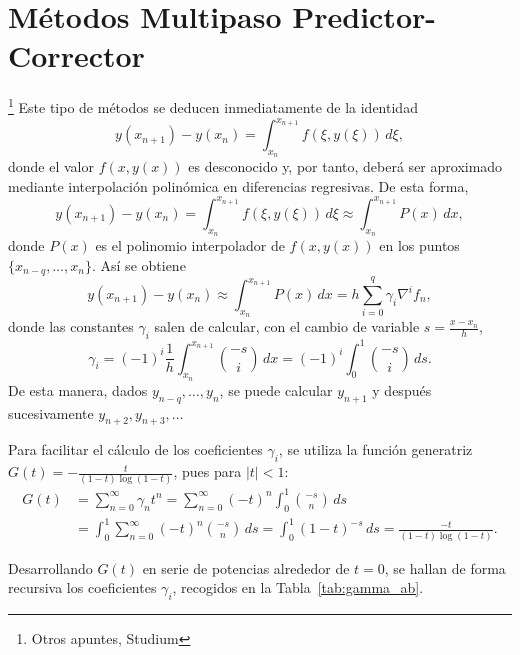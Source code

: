 \section{M\'etodos Multipaso Predictor-Corrector}
\footnote{Otros apuntes, Studium}
Este tipo de métodos se deducen inmediatamente de la identidad
\begin{equation*}
    y(x_{n+1}) - y(x_n) = \int_{x_n}^{x_{n+1}} f(\xi, y(\xi))\,d\xi,
\end{equation*}
donde el valor $f(x, y(x))$ es desconocido y, por tanto, deberá ser aproximado mediante interpolación polinómica en diferencias regresivas. De esta forma,
\begin{equation*}
    y(x_{n+1}) - y(x_n) = \int_{x_n}^{x_{n+1}} f(\xi, y(\xi))\,d\xi \approx \int_{x_n}^{x_{n+1}} P(x)\,dx,
\end{equation*}
donde $P(x)$ es el polinomio interpolador de $f(x, y(x))$ en los puntos $\{x_{n-q}, \dots, x_n\}$. Así se obtiene
\begin{equation*}
    y(x_{n+1}) - y(x_n) \approx \int_{x_n}^{x_{n+1}} P(x)\,dx = h \sum_{i=0}^{q} \gamma_i \nabla^i f_n,
    \tag{3.2.3}
\end{equation*}
donde las constantes $\gamma_i$ salen de calcular, con el cambio de variable $s = \frac{x - x_n}{h}$,
\begin{equation*}
    \gamma_i = (-1)^i \frac{1}{h} \int_{x_n}^{x_{n+1}} \binom{-s}{i}\,dx = (-1)^i \int_{0}^{1} \binom{-s}{i}\,ds.
\end{equation*}
De esta manera, dados $y_{n-q}, \dots, y_n$, se puede calcular $y_{n+1}$ y después sucesivamente $y_{n+2}, y_{n+3}, \dots$

Para facilitar el cálculo de los coeficientes $\gamma_i$, se utiliza la función generatriz $G(t) = -\frac{t}{(1-t)\log(1-t)}$, pues para $|t| < 1$:
\begin{align*}
    G(t) &= \sum_{n=0}^{\infty} \gamma_n t^n = \sum_{n=0}^{\infty} (-t)^n \int_{0}^{1} \binom{-s}{n}\,ds \nonumber \\
         &= \int_{0}^{1} \sum_{n=0}^{\infty} (-t)^n \binom{-s}{n}\,ds = \int_{0}^{1} (1-t)^{-s}\,ds = \frac{-t}{(1-t)\log(1-t)}.
\end{align*}

Desarrollando $G(t)$ en serie de potencias alrededor de $t = 0$, se hallan de forma recursiva los coeficientes $\gamma_i$, recogidos en la Tabla~\ref{tab:gamma_ab}.

